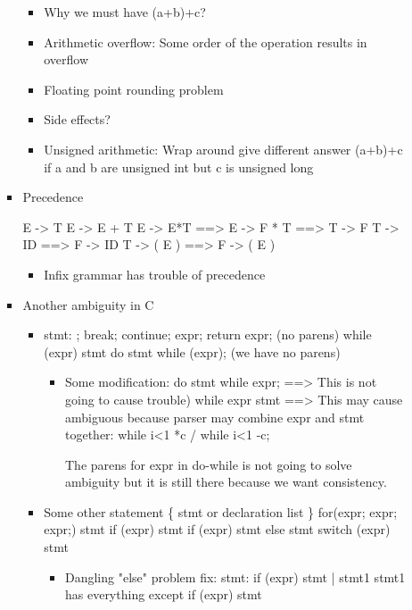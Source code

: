 \documentclass[11pt]{article}
\begin{document}
\begin{itemize}
\begin{itemize}
\begin{itemize}
\begin{itemize}
\item Why we must have (a+b)+c?
\item Arithmetic overflow: Some order of the operation results in overflow
\item Floating point rounding problem
\item Side effects?
\item Unsigned arithmetic: Wrap around give different answer
(a+b)+c if a and b are unsigned int but c is unsigned long
\end{itemize}

\item Precedence

E -> T
E -> E + T
E -> E*T   ==> E -> F * T
	   ==> T -> F
T -> ID    ==> F -> ID
T -> ( E ) ==> F -> ( E )

\begin{itemize}
\item Infix grammar has trouble of precedence
\end{itemize}

\item Another ambiguity in C
\begin{itemize}
\item stmt: 
;
break;
continue;
expr;
return expr; (no parens)
while (expr) stmt
do stmt while (expr); (we have no parens)

\begin{itemize}
\item Some modification:
do stmt while expr; ==> This is not going to cause trouble)
while expr stmt     ==> This may cause ambiguous because parser
may combine expr and stmt together:
while i<1 *c / while i<1 -c;

The parens for expr in do-while is not going to solve ambiguity
but it is still there because we want consistency.
\end{itemize}

\item Some other statement
\{ stmt or declaration list \}
for(expr; expr; expr;) stmt
if (expr) stmt
if (expr) stmt else stmt
switch (expr) stmt

\begin{itemize}
\item Dangling "else" problem
fix: stmt: if (expr) stmt | stmt1 
stmt1 has everything except if (expr) stmt
\end{itemize}
\end{itemize}
\end{itemize}


\end{itemize}
\end{itemize}
\end{document}
